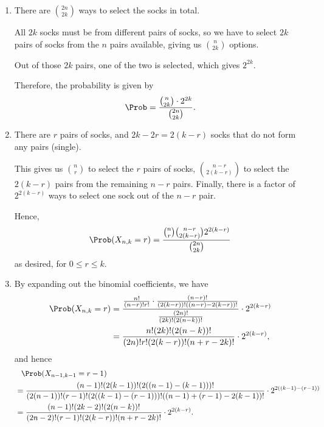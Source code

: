 \Question{\currfilebase}

\begin{enumerate}
    \item There are \(\binom{2n}{2k}\) ways to select the socks in total.

          All \(2k\) socks must be from different pairs of socks, so we have to select \(2k\) pairs of socks from the \(n\) pairs available, giving us \(\binom{n}{2k}\) options.

          Out of those \(2k\) pairs, one of the two is selected, which gives \(2^{2k}\).

          Therefore, the probability is given by
          \[
              \Prob = \frac{\binom{n}{2k} \cdot 2^{2k}}{\binom{2n}{2k}}.
          \]

    \item There are \(r\) pairs of socks, and \(2k - 2r = 2 (k - r)\) socks that do not form any pairs (single).

          This gives us \(\binom{n}{r}\) to select the \(r\) pairs of socks, \(\binom{n - r}{2(k - r)}\) to select the \(2(k - r)\) pairs from the remaining \(n - r\) pairs. Finally, there is a factor of \(2^{2 (k - r)}\) ways to select one sock out of the \(n - r\) pair.

          Hence,
          \[
              \Prob(X_{n, k} = r) = \frac{\binom{n}{r} \binom{n - r}{2 (k - r)} 2^{2 (k - r)}}{\binom{2n}{2k}}
          \]
          as desired, for \(0 \leq r \leq k\).

    \item By expanding out the binomial coefficients, we have
          \begin{align*}
              \Prob(X_{n, k} = r) & = \frac{\frac{n!}{(n - r)! r!} \cdot \frac{(n - r)!}{(2(k - r))! ((n - r) - 2(k - r))!}}{\frac{(2n)!}{(2k)! (2(n - k))!}} \cdot 2^{2 (k - r)} \\
                                  & = \frac{n! (2k)! (2(n - k))!}{(2n)! r! (2(k - r))! (n + r - 2k)!} \cdot 2^{2 (k - r)},
          \end{align*}
          and hence
          \begin{align*}
               & \phantom{=} \Prob(X_{n - 1, k - 1} = r - 1)                                                                                                                          \\
               & = \frac{(n - 1)! (2 (k - 1))! (2((n - 1) - (k - 1)))!}{(2(n - 1))! (r - 1)! (2((k - 1) - (r - 1)))! ((n - 1) + (r - 1) - 2(k - 1))!} \cdot 2^{2 ((k - 1) - (r - 1))} \\
               & = \frac{(n - 1)! (2k - 2)! (2(n - k))!}{(2n - 2)! (r - 1)! (2(k - r))! (n + r - 2k)!} \cdot 2^{2 (k - r)}.
          \end{align*}


\end{enumerate}
